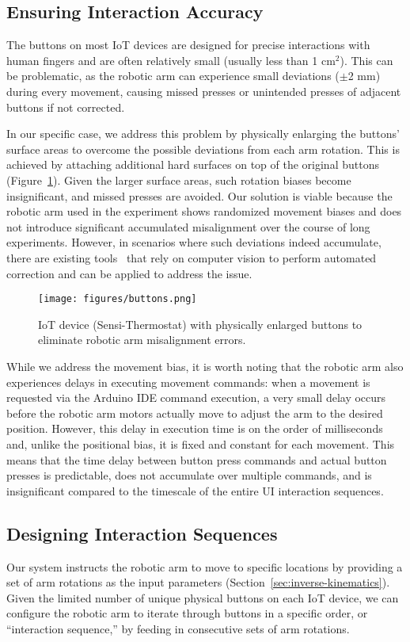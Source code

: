 \subsection{Ensuring Interaction Accuracy}
The buttons on most IoT devices are designed for precise interactions with human fingers and are often relatively small (usually less than 1 cm$^2$). This can be problematic, as the robotic arm can experience small deviations ($\pm$2 mm) during every movement, causing missed presses or unintended presses of adjacent buttons if not corrected.

In our specific case, we address this problem by physically enlarging the buttons' surface areas to overcome the possible deviations from each arm rotation. This is achieved by attaching additional hard surfaces on top of the original buttons (Figure~\ref{fig:buttons}). Given the larger surface areas, such rotation biases become insignificant, and missed presses are avoided.
Our solution is viable because the robotic arm used in the experiment shows randomized movement biases and does not introduce significant accumulated misalignment over the course of long experiments.
However, in scenarios where such deviations indeed accumulate, there are existing tools~\cite{vision-based-robotic-grasping,mariottini2011active,kumar2018computer} that rely on computer vision to perform automated correction and can be applied to address the issue.

\begin{figure}
    \centering
    \texttt{[image: figures/buttons.png]}
    \caption{IoT device (Sensi-Thermostat) with physically enlarged buttons to eliminate robotic arm misalignment errors.}
    \label{fig:buttons}
\end{figure}

While we address the movement bias, it is worth noting that the robotic arm also experiences delays in executing movement commands: when a movement is requested via the Arduino IDE command execution, a very small delay occurs before the robotic arm motors actually move to adjust the arm to the desired position. However, this delay in execution time is on the order of milliseconds and, unlike the positional bias, it is fixed and constant for each movement. This means that the time delay between button press commands and actual button presses is predictable, does not accumulate over multiple commands, and is insignificant compared to the timescale of the entire UI interaction sequences. 

\subsection{Designing Interaction Sequences}
\label{sec:interaction-seqs}
Our system instructs the robotic arm to move to specific locations by providing a set of arm rotations as the input parameters (Section~\ref{sec:inverse-kinematics}). Given the limited number of unique physical buttons on each IoT device, we can configure the robotic arm to iterate through buttons in a specific order, or ``interaction sequence,'' by feeding in consecutive sets of arm rotations.

